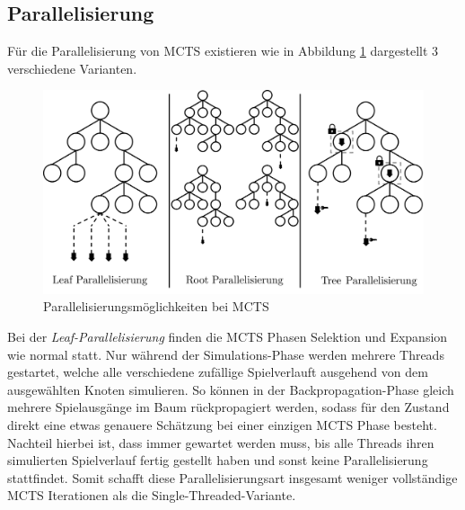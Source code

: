 \subsection{Parallelisierung}

Für die Parallelisierung von \ac{MCTS} existieren wie in Abbildung \ref{fig:mcts-parallization} dargestellt 3 verschiedene Varianten.

\vspace*{-0.3cm}
\begin{figure}[!ht]
    \centering
    \includegraphics[width=\textwidth]{res/pictures/mcts-parallization.pdf}
    \vspace*{-0.75cm}
    \caption[Parallelisierungsmöglichkeiten bei MCTS]{Parallelisierungsmöglichkeiten bei \acs{MCTS}}
    \label{fig:mcts-parallization}
\end{figure}
\vspace*{-0.15cm}

Bei der \emph{Leaf-Parallelisierung} finden die \ac{MCTS} Phasen Selektion und Expansion wie normal statt. Nur während der Simulations-Phase werden mehrere Threads gestartet, welche alle verschiedene zufällige Spielverlauft ausgehend von dem ausgewählten Knoten simulieren. So können in der Backpropagation-Phase gleich mehrere Spielausgänge im Baum rückpropagiert werden, sodass für den Zustand direkt eine etwas genauere Schätzung bei einer einzigen \ac{MCTS} Phase besteht. Nachteil hierbei ist, dass immer gewartet werden muss, bis alle Threads ihren simulierten Spielverlauf fertig gestellt haben und sonst keine Parallelisierung stattfindet. Somit schafft diese Parallelisierungsart insgesamt weniger vollständige \ac{MCTS} Iterationen als die Single-Threaded-Variante. \cite[S. 63]{2008.ParallelMCTS}

\vspace*{-5cm}

\pagebreak


